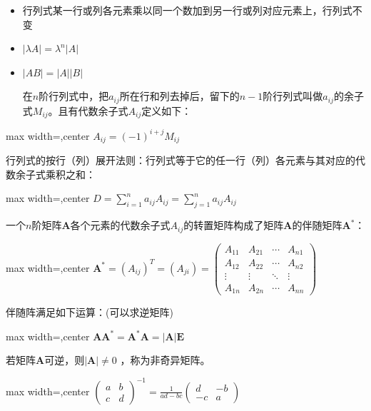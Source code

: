 \documentclass[twocolumn,10pt]{ctexart}
\begin{document}
\begin{itemize}
\item 行列式某一行或列各元素乘以同一个数加到另一行或列对应元素上，行列式不变
\end{itemize}

\begin{itemize}
\item $|\lambda A|=\lambda^n|A|$
\end{itemize}

\begin{itemize}
\item $|AB|=|A||B|$

在$n$阶行列式中，把$a_{ij}$所在行和列去掉后，留下的$n-1$阶行列式叫做$a_{ij}$的余子式$M_{ij}$。且有代数余子式$A_{ij}$定义如下：
\end{itemize}

\begin{adjustbox}{max width=\linewidth,center}
$A_{ij}=(-1)^{i+j}M_{ij}$
\end{adjustbox}

行列式的按行（列）展开法则：行列式等于它的任一行（列）各元素与其对应的代数余子式乘积之和：

\begin{adjustbox}{max width=\linewidth,center}
$D=\sum_{i=1}^na_{ij}A_{ij}=\sum_{j=1}^na_{ij}A_{ij}$
\end{adjustbox}

一个$n$阶矩阵$\mathbf{A}$各个元素的代数余子式$A_{ij}$的转置矩阵构成了矩阵$\mathbf{A}$的伴随矩阵$\mathbf{A^*}$：

\begin{adjustbox}{max width=\linewidth,center}
$\mathbf{A^*}=(A_{ij})^T=(A_{ji})=\left(\begin{matrix}A_{11}&A_{21}&\cdots&A_{n1}\\A_{12}&A_{22}&\cdots&A_{n2}\\\vdots&\vdots&\ddots&\vdots\\A_{1n}&A_{2n}&\cdots&A_{nn}\end{matrix}\right)$
\end{adjustbox}

伴随阵满足如下运算：(可以求逆矩阵)

\begin{adjustbox}{max width=\linewidth,center}
$\mathbf{AA^*=A^*A=|A|E}$
\end{adjustbox}

若矩阵$\mathbf{A}$可逆，则$|\mathbf{A}|\neq0$ ，称为非奇异矩阵。

\begin{adjustbox}{max width=\linewidth,center}
$\left(\begin{matrix}a&b\\c&d\end{matrix}\right)^{-1}=\frac1{ad-bc}\left(\begin{matrix}d&-b\\-c&a\end{matrix}\right)$
\end{adjustbox}
\end{document}
